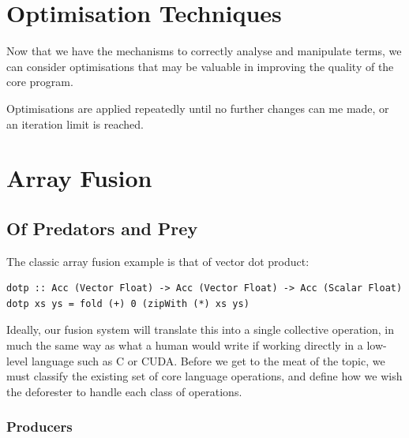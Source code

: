 
\section{Optimisation Techniques}

Now that we have the mechanisms to correctly analyse and manipulate terms, we
can consider optimisations that may be valuable in improving the quality of the
core program. 

Optimisations are applied repeatedly
until no further changes can me made, or an iteration limit is reached.


\section{Array Fusion}
\subsection{Of Predators and Prey}

The classic array fusion example is that of vector dot product:
%
\begin{lstlisting}[style=haskell,
    label={lst:dotp},
    caption={Vector dot product in Accelerate}]
dotp :: Acc (Vector Float) -> Acc (Vector Float) -> Acc (Scalar Float)
dotp xs ys = fold (+) 0 (zipWith (*) xs ys)
\end{lstlisting}
%
Ideally, our fusion system will translate this into a single collective
operation, in much the same way as what a human would write if working directly
in a low-level language such as C or CUDA. Before we get to the meat of the
topic, we must classify the existing set of core language operations, and define
how we wish the deforester to handle each class of operations.

\subsubsection{Producers}

